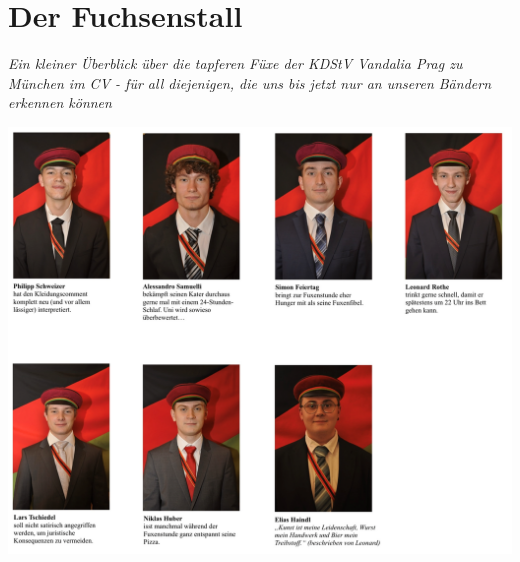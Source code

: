 \section{Der Fuchsenstall}

\begin{multicols}{2}





\textit{Ein kleiner Überblick über die tapferen Füxe der KDStV
Vandalia Prag zu München im CV - für all diejenigen, die uns bis jetzt nur an
unseren Bändern erkennen können}


\end{multicols}


\begin{figurehere}
		\includegraphics[width=1\linewidth]{Bilder/Neue Bilder/Fuechse/Fuechse_Vorstellung}



	\end{figurehere}






